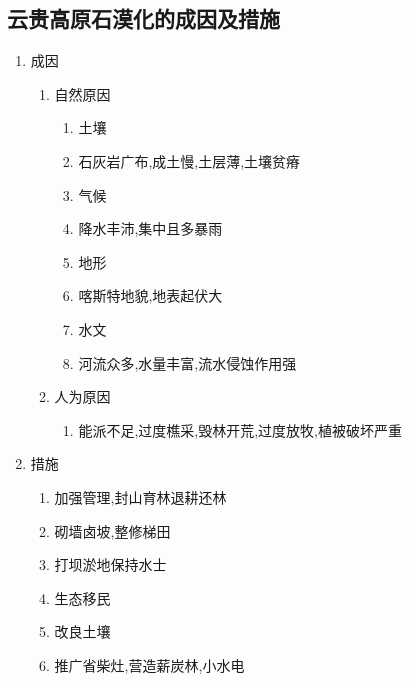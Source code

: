 \documentclass[a4paper]{article}
\begin{document}
    \subsection{云贵高原石漠化的成因及措施}
    \begin{enumerate}
        \item 成因
        \begin{enumerate}
            \item 自然原因
            \begin{enumerate}
                \item 土壤
                    \item 石灰岩广布,成土慢,土层薄,土壤贫瘠
                \item 气候
                    \item 降水丰沛,集中且多暴雨
                \item 地形
                    \item 喀斯特地貌,地表起伏大
                \item 水文
                    \item 河流众多,水量丰富,流水侵蚀作用强
            \end{enumerate}
            \item 人为原因
            \begin{enumerate}
                \item 能派不足,过度樵采,毁林开荒,过度放牧,植被破坏严重
            \end{enumerate}
        \end{enumerate}
        \item 措施
        \begin{enumerate}
            \item 加强管理,封山育林退耕还林
            \item 砌墙卤坡,整修梯田
            \item 打坝淤地保持水士
            \item 生态移民
            \item 改良土壤
            \item 推广省柴灶,营造薪炭林,小水电
        \end{enumerate}
    \end{enumerate}
\end{document}
